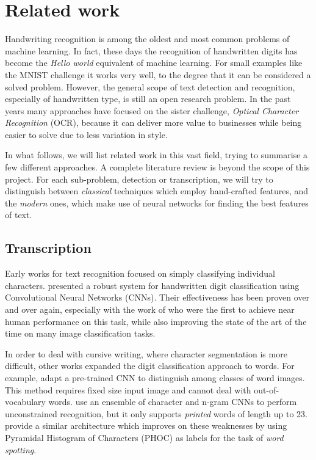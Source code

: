 

\section{Related work}\label{sec:related_work}
	Handwriting recognition is among the oldest and most common problems of machine learning. In fact, these days the recognition of handwritten digits has become the \textit{Hello world} equivalent of machine learning. For small examples like the MNIST challenge it works very well, to the degree that it can be considered a solved problem. However, the general scope of text detection and recognition, especially of handwritten type, is still an open research problem. In the past years many approaches have focused on the sister challenge, \emph{Optical Character Recognition} (OCR), because it can deliver more value to businesses while being easier to solve due to less variation in style.

	In what follows, we will list related work in this vast field, trying to summarise a few different approaches. A complete literature review is beyond the scope of this project. For each sub-problem, detection or transcription, we will try to distinguish between \emph{classical} techniques which employ hand-crafted features, and the \emph{modern} ones, which make use of neural networks for finding the best features of text.


	\subsection{Transcription}\label{sec:related_transcription}
		Early works for text recognition focused on simply classifying individual characters.  presented a robust system for handwritten digit classification using Convolutional Neural Networks (CNNs). Their effectiveness has been proven over and over again, especially with the work of \citet{ciresan} who were the first to achieve near human performance on this task, while also improving the state of the art of the time on many image classification tasks.

		In order to deal with cursive writing, where character segmentation is more difficult, other works expanded the digit classification approach to words. For example, \citet{sharma2015adapting} adapt a pre-trained CNN to distinguish among classes of word images. This method requires fixed size input image and cannot deal with out-of-vocabulary words.  use an ensemble of character and n-gram CNNs to perform unconstrained recognition, but it only supports \emph{printed} words of length up to 23.  provide a similar architecture which improves on these weaknesses by using Pyramidal Histogram of Characters (PHOC) as labels for the task of \emph{word spotting}.

